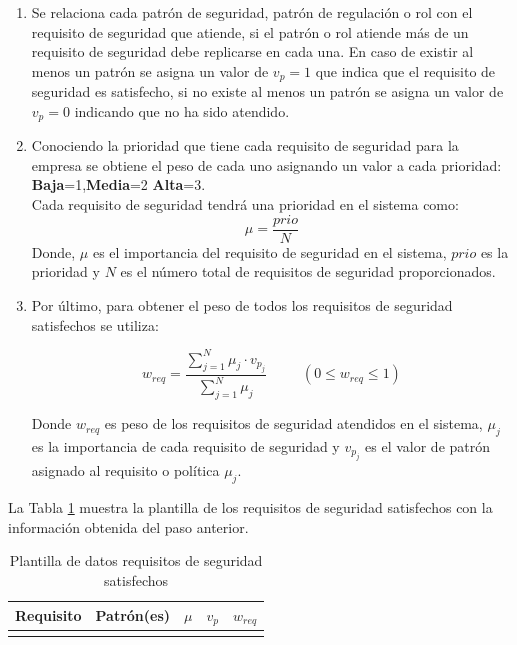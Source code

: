 \begin{enumerate}[label=Paso \arabic*:,leftmargin=*]
\begin{enumerate}[noitemsep]
	\item Se relaciona cada patrón de seguridad, patrón de regulación o rol con el requisito de seguridad que atiende, si el patrón o rol atiende más de un requisito de seguridad debe replicarse en cada una. En caso de existir al menos un patrón se asigna un valor de $v_p=1$ que indica que el requisito de seguridad es satisfecho, si no existe al menos un patrón se asigna un valor de $v_p=0$ indicando que no ha sido atendido.
	\item Conociendo la prioridad que tiene cada requisito de seguridad para la empresa se obtiene el peso de cada uno asignando un valor a cada prioridad: \textbf{Baja}=1,\textbf{Media}=2 \textbf{Alta}=3.\\
	Cada requisito de seguridad tendrá una prioridad en el sistema como:
	\begin{equation*}
		\mu= \frac{prio}{N}
	\end{equation*}
	Donde, $\mu$ es el importancia del requisito de seguridad en el sistema, $prio$ es la prioridad y $N$ es el número total de requisitos de seguridad proporcionados. 
	
	\item Por último, para obtener el peso de todos los requisitos de seguridad satisfechos se utiliza:
	
	\begin{equation*}
		w_{req}= \frac{\displaystyle\sum_{j=1}^{N}\mu_j \cdot v_{p_j}}{\displaystyle\sum_{j=1}^{N}\mu_j} \hspace{30pt} (0 \leq w_{req} \leq 1)
	\end{equation*}
	
	Donde $w_{req}$ es peso de los requisitos de seguridad atendidos en el sistema, $\mu_j$ es la importancia de cada requisito de seguridad y $v_{p_j}$ es el valor de patrón asignado al requisito o política $\mu_j$.
\end{enumerate}

La Tabla \ref{datos_eval_req} muestra la plantilla de los requisitos de seguridad satisfechos con la información obtenida del paso anterior. 

\begin{table}[!ht]
\caption{Plantilla de datos requisitos de seguridad satisfechos}
\begin{center}
\scriptsize{
\begin{tabular}{ |c|c|c|c|c|}
\hline
	\cellcolor{lightgray}Requisito&\cellcolor{lightgray}Patrón(es)&\cellcolor{lightgray}$\mu$& \cellcolor{lightgray}$v_p$ & \cellcolor{lightgray}$w_{req}$ \\ \hline
	&&&&\\\hline
\end{tabular}
}
\end{center}
\label{datos_eval_req}
\end{table}


\end{enumerate}
